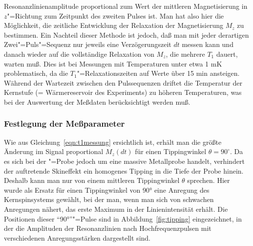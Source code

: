 Resonanzlinienamplitude proportional zum Wert der mittleren Magnetisierung in $z$"=Richtung zum
Zeitpunkt des zweiten Pulses ist. Man hat also hier die Möglichkeit, die zeitliche Entwicklung der
Relaxation der Magnetisierung $M_z$ zu bestimmen. Ein Nachteil dieser Methode ist jedoch, daß man
mit jeder derartigen Zwei"=Puls"=Sequenz nur jeweils eine Verzögerungszeit $dt$ messen kann und
danach wieder auf die vollständige Relaxation von $M_z$, die mehrere $T_1$
dauert, warten muß. 
Dies ist bei Messungen mit Temperaturen unter etwa 1 mK problematisch, da die
$T_1$"=Relaxationszeiten auf Werte über 15 min ansteigen. Während der Wartezeit zwischen den
Pulssequenzen driftet die Temperatur der Kernstufe (= Wärmereservoir des Experiments) zu höheren
Temperaturen, was bei der Auswertung der Meßdaten berücksichtigt werden muß.

\subsubsection{Festlegung der Meßparameter}

Wie aus Gleichung~\eqref{eqn:t1messung} ersichtlich ist, erhält man die größte Änderung im Signal
proportional $M_z(dt)$ für einen Tippingwinkel $\theta=90^\circ$. Da es sich bei der
\aug"=Probe jedoch um eine massive Metallprobe handelt, verhindert der auftretende Skineffekt ein
homogenes Tipping in die Tiefe der Probe hinein. Deshalb kann man nur von einem mittleren
Tippingwinkel $\theta$ sprechen. Hier wurde als Ersatz für einen
Tippingwinkel von 90° eine Anregung des Kernspinsystems gewählt, bei der man, wenn man sich von
schwachen Anregungen nähert, das erste Maximum in der Linienintensität erhält. Die Positionen
dieser "`90°"'"=Pulse sind in Abbildung~\ref{fig:tipping} eingezeichnet, in der die Amplituden der
Resonanzlinien nach Hochfrequenzpulsen mit verschiedenen Anregungsstärken dargestellt sind.

